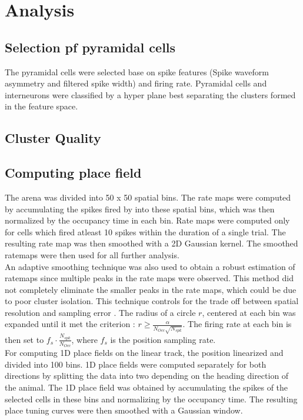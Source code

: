 \section{Analysis}
\label{analysis}

\subsection{Selection pf pyramidal cells}
The pyramidal cells were selected base on spike features (Spike waveform asymmetry and filtered spike width) \cite{Sirota2008} and firing rate. Pyramidal cells and interneurons were classified by a hyper plane best separating the clusters formed in the feature space. 

\subsection{Cluster Quality}

\subsection{Computing place field}
\label{pfcompute}
The arena was divided into 50 x 50 spatial bins. The rate maps were computed by accumulating the spikes fired by into these spatial bins, which was then normalized by the occupancy time in each bin.
Rate maps were computed only for cells which fired atleast 10 spikes within the duration of a single trial. The resulting rate map was then smoothed with a 2D Gaussian kernel. The smoothed ratemaps were then used for all further analysis.\\ 
An adaptive smoothing technique was also used to obtain a robust estimation of ratemaps since multiple peaks in the rate maps were observed. This method did not completely eliminate the smaller peaks in the rate maps, which could be due to poor cluster isolation. This technique controls for the trade off between spatial resolution and sampling error \cite{Skaggs1996c}. The radius of a circle $r$, centered at each bin was expanded until it met the criterion :   $ r \geq \frac{\alpha}{N_{Occ} \sqrt{N_{spk}}}$. The firing rate at each bin is then set to $f_{s} \cdot \frac{N_{spk}}{N_{Occ}}$, where $f_{s}$ is the position sampling rate.\\

For computing 1D place fields on the linear track, the position linearized and divided into 100 bins.
1D place fields were computed separately for both directions by splitting the data into two depending on the heading direction of the animal. The 1D place field was obtained by accumulating the spikes of the selected cells in these bins and normalizing by the occupancy  time. The resulting place tuning curves were then smoothed with a Gaussian window.\\

